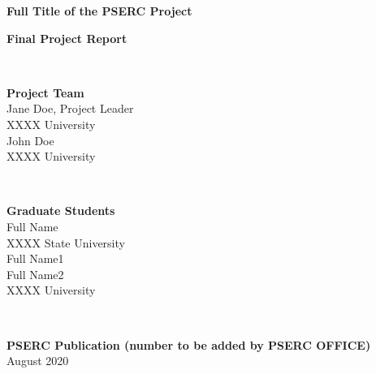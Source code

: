 \documentclass[letterpaper, 12pt, oneside]{book}
\theoremstyle{plain}
\theoremstyle{definition}
\theoremstyle{remark}
\begin{document}
\begin{titlepage}
\centering
\quad
\begin{LARGE}
\begin{spacing}{1}
\textbf{Full Title of the PSERC Project}
\end{spacing}
\end{LARGE}

\vspace{50pt}
\begin{large}
\textbf{Final Project Report}
\end{large}
\\
\vspace{40pt}
\begin{large}
\textbf{Project Team}\\
Jane Doe, Project Leader\\
XXXX University\\
\vspace{10pt}
John Doe\\
XXXX University
\end{large}
\\
\vspace{30pt}
\begin{large}
\textbf{Graduate Students}\\
Full Name\\
XXXX State University\\
\vspace{10pt}
Full Name1\\
Full Name2\\
\vspace{5pt}
XXXX University
\end{large}
\\
\vspace{60pt}
\begin{normalsize}
\textbf{PSERC Publication (number to be added by PSERC OFFICE)}\\
\vspace{20pt}
August 2020
\end{normalsize}
\end{titlepage}

\end{document}
